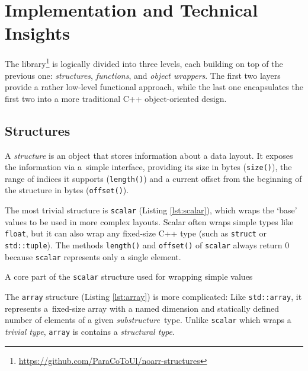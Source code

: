 \section{Implementation and Technical Insights}\label{sec:implementation}

The \Noarr{} library\footnote{\url{https://github.com/ParaCoToUl/noarr-structures}} is logically divided into three levels, each building on top of the previous one: \emph{structures}, \emph{functions}, and \emph{object wrappers}. The first two layers provide a rather low-level functional approach, while the last one encapsulates the first two into a more traditional C++ object-oriented design.

\subsection{Structures} 

A \emph{structure} is an object that stores information about a data layout. It exposes the information via a~simple interface, providing its size in bytes (\texttt{size()}), the range of indices it supports (\texttt{length()}) and a current offset from the beginning of the structure in bytes (\texttt{offset()}).

The most trivial structure is \texttt{scalar} (Listing \ref{lst:scalar}), which wraps the `base' values to be used in more complex layouts. Scalar often wraps simple types like \texttt{float}, but it can also wrap any fixed-size C++ type (such as \texttt{struct} or \texttt{std::tuple}). The methods \texttt{length()} and \texttt{offset()} of \texttt{scalar} always return $0$ because \texttt{scalar} represents only a single element.

\begin{listing}[h]
  \vspace{-10pt}
  \vspace{-20pt}
  \caption{A core part of the \texttt{scalar} structure used for wrapping simple values}
  \label{lst:scalar}
\end{listing}

The \texttt{array} structure (Listing \ref{lst:array}) is more complicated: Like \texttt{std::array}, it represents a~fixed-size array with a named dimension and statically defined number of elements of a given \emph{substructure}~type. Unlike \texttt{scalar} which wraps a \emph{trivial type}, \texttt{array} is contains a \Noarr{} \emph{structural type}.

